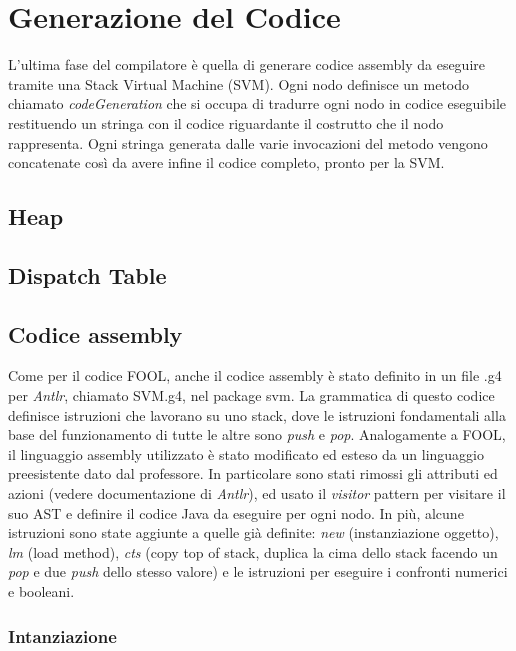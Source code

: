 \documentclass{scrreprt}
\begin{document}
\chapter{Generazione del Codice}

L'ultima fase del compilatore è quella di generare codice assembly da eseguire tramite una Stack Virtual Machine (SVM).
Ogni nodo definisce un metodo chiamato \textit{codeGeneration} che si occupa di tradurre ogni nodo in codice eseguibile restituendo un stringa con il codice
riguardante il costrutto che il nodo rappresenta. Ogni stringa generata dalle varie invocazioni del metodo vengono concatenate così da avere infine il codice completo, 
pronto per la SVM. 

\section{Heap}

\section{Dispatch Table}

\section{Codice assembly}
Come per il codice FOOL, anche il codice assembly è stato definito in un file .g4 per \textit{Antlr}, chiamato SVM.g4, nel package svm. La grammatica di questo codice
definisce istruzioni che lavorano su uno stack, dove le istruzioni fondamentali alla base del funzionamento di tutte le altre sono \textit{push} e \textit{pop}. Analogamente a FOOL, 
il linguaggio assembly utilizzato è stato modificato ed esteso da un linguaggio preesistente dato dal professore. In particolare sono stati rimossi gli attributi ed azioni (vedere documentazione di \textit{Antlr}),
ed usato il \textit{visitor} pattern per visitare il suo AST e definire il codice Java da eseguire per ogni nodo. In più, alcune istruzioni sono state aggiunte a quelle già definite: \textit{new} (instanziazione oggetto), \textit{lm} (load method), \textit{cts} (copy top of stack, duplica la cima dello stack facendo un \textit{pop} e due \textit{push} dello stesso valore) e le istruzioni per eseguire
i confronti numerici e booleani.

\subsection{Intanziazione}
\end{document}

